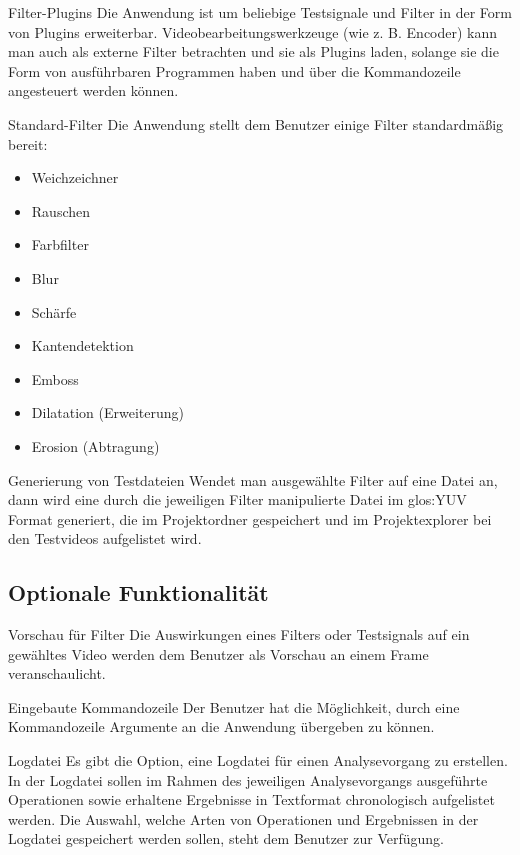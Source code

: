  Filter-Plugins
\newline
Die Anwendung ist um beliebige Testsignale und Filter in der Form von Plugins erweiterbar.
 Videobearbeitungswerkzeuge (wie z. B. Encoder) kann man auch als externe Filter betrachten und sie als
  Plugins laden, solange sie die Form von ausführbaren Programmen haben und über die Kommandozeile 
angesteuert werden können.

 Standard-Filter
\newline
Die Anwendung stellt dem Benutzer einige Filter standardmäßig bereit:
\begin{itemize}
\item Weichzeichner
\item Rauschen
\item Farbfilter
\item Blur
\item Schärfe
\item Kantendetektion
\item Emboss
\item Dilatation (Erweiterung)
\item Erosion (Abtragung)

\end{itemize}

 Generierung von Testdateien
\newline
Wendet man ausgewählte Filter auf eine Datei an, dann wird eine durch die jeweiligen Filter manipulierte Datei im \gls{glos:YUV} Format generiert, die im Projektordner gespeichert und im Projektexplorer bei den Testvideos aufgelistet wird.





\subsection{Optionale Funktionalität}

 Vorschau für Filter
\newline
Die Auswirkungen eines Filters oder Testsignals auf ein gewähltes Video werden dem Benutzer als Vorschau an einem Frame veranschaulicht.


 Eingebaute Kommandozeile
\newline
Der Benutzer hat die Möglichkeit, durch eine Kommandozeile Argumente an die Anwendung übergeben zu können.

 Logdatei
\newline
Es gibt die Option, eine Logdatei für einen Analysevorgang zu erstellen. In der Logdatei sollen im Rahmen
 des jeweiligen Analysevorgangs ausgeführte Operationen sowie erhaltene Ergebnisse in Textformat
  chronologisch aufgelistet werden. Die Auswahl, welche Arten von Operationen und Ergebnissen in der
   Logdatei gespeichert werden sollen, steht dem Benutzer zur Verfügung.
